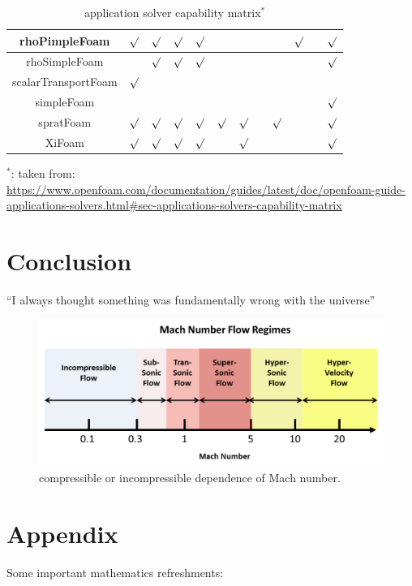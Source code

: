 \documentclass{article}
\begin{document}
\begin{landscape}
\begin{table}[h!]
\begin{tabular}{cccccccccccc}
\hline
rhoPimpleFoam & $\surd$ & $\surd$ & $\surd$ & $\surd$ & & & & & $\surd$ & & $\surd$ \\
\hline
rhoSimpleFoam & & $\surd$ & $\surd$ & $\surd$ & & & & & & &  $\surd$\\
\hline
scalarTransportFoam & $\surd$ & & & & & & & & & & \\
\hline
simpleFoam & & & & & & & & &  & & $\surd$ \\	
\hline
spratFoam & $\surd$ & $\surd$ & $\surd$ & $\surd$ & $\surd$ & $\surd$& & $\surd$ & & & $\surd$ \\
\hline
XiFoam & $\surd$ & $\surd$ & $\surd$ & $\surd$ & & $\surd$ & & & & & $\surd$\\
\hline
\end{tabular}
    \caption{application solver capability matrix$^*$}
    \label{tab:solver compatibility}
\end{table}
$^*$: taken from: 
\url{https://www.openfoam.com/documentation/guides/latest/doc/openfoam-guide-applications-solvers.html#sec-applications-solvers-capability-matrix}

\end{landscape}



\section{Conclusion}
``I always thought something was fundamentally wrong with the universe'' \citep{adams1995hitchhiker}

\begin{figure}[h!]
\centering
\includegraphics[scale=0.4]{compressible.png} 
\caption{compressible or incompressible dependence of Mach number.}
\label{fig:universe}
\end{figure}

\appendix
\section{Appendix}
Some important mathematics refreshments: 
\end{document}
